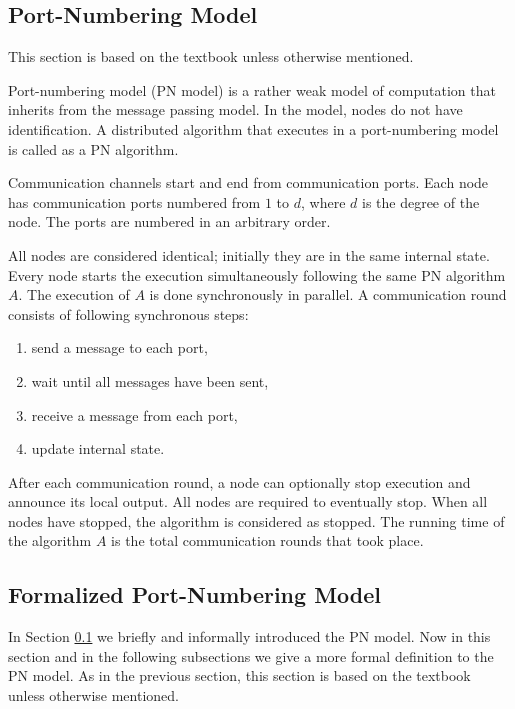 \subsection{Port-Numbering Model} \label{sec:port-numbering_model}
This section is based on the textbook \cite{HirvonenSuomelaDistAlg2020} unless otherwise mentioned.

Port-numbering model (PN model) is a rather weak model of computation that inherits from the message passing model.
In the model, nodes do not have identification.
A distributed algorithm that executes in a port-numbering model is called as a PN algorithm.


Communication channels start and end from communication ports.
Each node has communication ports numbered from $1$ to $d$, where $d$ is the degree of the node.
The ports are numbered in an arbitrary order.

All nodes are considered identical; initially they are in the same internal state.
Every node starts the execution simultaneously following the same PN algorithm $A$.
The execution of $A$ is done synchronously in parallel.
A communication round consists of following synchronous steps:
\begin{enumerate}
  \item send a message to each port,
  \item wait until all messages have been sent,
  \item receive a message from each port,
  \item update internal state.
\end{enumerate}
After each communication round, a node can optionally stop execution and announce its local output.
All nodes are required to eventually stop.
When all nodes have stopped, the algorithm is considered as stopped.
The running time of the algorithm $A$ is the total communication rounds that took place.


\subsection{Formalized Port-Numbering Model} \label{sec:formalized_pn_model}
In Section \ref{sec:port-numbering_model} we briefly and informally introduced the PN model.
Now in this section and in the following subsections we give a more formal definition to the PN model.
As in the previous section, this section is based on the textbook \cite{HirvonenSuomelaDistAlg2020} unless otherwise mentioned.

